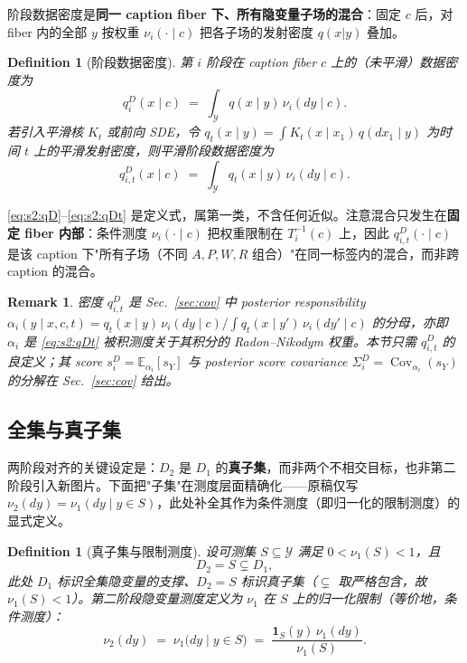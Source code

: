 \documentclass[11pt,a4paper]{article}
\newtheorem{definition}[theorem]{Definition}
\newtheorem{remark}[theorem]{Remark}
\DeclareMathOperator{\Cov}{Cov}
\newcommand{\E}{\mathbb{E}}
\newcommand{\cY}{\mathcal{Y}}
\begin{document}
阶段数据密度是\textbf{同一 caption fiber 下、所有隐变量子场的混合}：固定 $c$ 后，对 fiber 内的全部 $y$ 按权重 $\nu_i(\cdot\mid c)$ 把各子场的发射密度 $q(x|y)$ 叠加。

\begin{definition}[阶段数据密度]\label{def:s2:qD}
第 $i$ 阶段在 caption fiber $c$ 上的（未平滑）数据密度为
\begin{equation}\label{eq:s2:qD}
q_i^D(x\mid c)\;=\;\int_{\cY} q(x\mid y)\,\nu_i(dy\mid c).
\end{equation}
若引入平滑核 $K_t$ 或前向 SDE，令 $q_t(x\mid y)=\int K_t(x\mid x_1)\,q(dx_1\mid y)$ 为时间 $t$ 上的平滑发射密度，则\emph{平滑阶段数据密度}为
\begin{equation}\label{eq:s2:qDt}
q_{i,t}^D(x\mid c)\;=\;\int_{\cY} q_t(x\mid y)\,\nu_i(dy\mid c).
\end{equation}
\end{definition}

\eqref{eq:s2:qD}--\eqref{eq:s2:qDt} 是定义式，属第一类，不含任何近似。注意混合只发生在\textbf{固定 fiber 内部}：条件测度 $\nu_i(\cdot\mid c)$ 把权重限制在 $T_i^{-1}(c)$ 上，因此 $q_{i,t}^D(\cdot\mid c)$ 是该 caption 下"所有子场（不同 $A,P,W,R$ 组合）"在同一标签内的混合，而非跨 caption 的混合。

\begin{remark}\label{rem:s2:postsetup}
密度 $q_{i,t}^D$ 是 Sec.~\ref{sec:cov} 中 posterior responsibility $\alpha_i(y\mid x,c,t)=q_t(x\mid y)\,\nu_i(dy\mid c)/\!\int q_t(x\mid y')\,\nu_i(dy'\mid c)$ 的分母，亦即 $\alpha_i$ 是 \eqref{eq:s2:qDt} 被积测度关于其积分的 Radon--Nikodym 权重。本节只需 $q_{i,t}^D$ 的良定义；其 score $s_i^D=\E_{\alpha_i}[s_Y]$ 与 posterior score covariance $\Sigma_i^D=\Cov_{\alpha_i}(s_Y)$ 的分解在 Sec.~\ref{sec:cov} 给出。
\end{remark}

\subsection{全集与真子集}\label{ss:s2:subset}

两阶段对齐的关键设定是：$D_2$ 是 $D_1$ 的\textbf{真子集}，而非两个不相交目标，也非第二阶段引入新图片。下面把"子集"在测度层面精确化——原稿仅写 $\nu_2(dy)=\nu_1(dy\mid y\in S)$，此处补全其作为条件测度（即归一化的限制测度）的显式定义。

\begin{definition}[真子集与限制测度]\label{def:s2:subset}
设可测集 $S\subseteq\cY$ 满足 $0<\nu_1(S)<1$，且
\begin{equation}\label{eq:s2:subsetset}
D_2=S\subsetneq D_1,
\end{equation}
此处 $D_1$ 标识全集隐变量的支撑、$D_2=S$ 标识真子集（$\subsetneq$ 取严格包含，故 $\nu_1(S)<1$）。第二阶段隐变量测度定义为 $\nu_1$ 在 $S$ 上的\emph{归一化限制}（等价地，条件测度）：
\begin{equation}\label{eq:s2:nu2}
\nu_2(dy)\;=\;\nu_1\bigl(dy\mid y\in S\bigr)\;=\;\frac{\mathbf{1}_S(y)\,\nu_1(dy)}{\nu_1(S)}.
\end{equation}
\end{definition}
\end{document}
